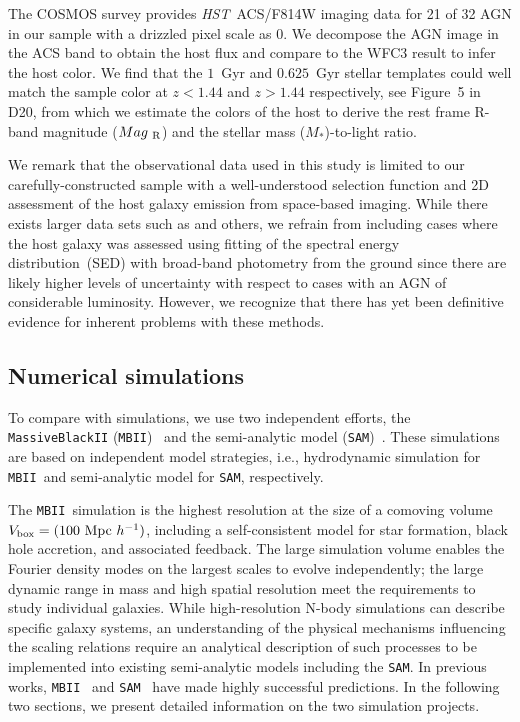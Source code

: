 \documentclass[twocolumn,trackchanges]{aastex63}
\newcommand{\hst}{{\it HST}}
\newcommand{\mr}{$Mag_{\rm ~R}$}
\newcommand{\mstar}{{$M_*$}}
\newcommand{\sam}{\texttt{SAM}}
\newcommand{\mbii}{\texttt{MBII}}
\begin{document}
The COSMOS survey provides \hst\ ACS/F814W imaging data for 21 of 32 AGN in our sample with a drizzled pixel scale as 0. We decompose the AGN image in the ACS band to obtain the host flux and compare to the WFC3 result to infer the host color. We find that the $1$~Gyr and $0.625$~Gyr stellar templates could well match the sample color at $z<1.44$ and $z>1.44$ respectively, see Figure~5 in D20, from which we estimate the colors of the host to derive the rest frame R-band magnitude (\mr) and the stellar mass (\mstar)-to-light ratio.

We remark that the observational data used in this study is limited to our carefully-constructed sample with a well-understood selection function and 2D assessment of the host galaxy emission from space-based imaging. While there exists larger data sets such as \citet{Sun2015} and others, we refrain from including cases where the host galaxy was assessed using fitting of the spectral energy distribution~(SED) with broad-band photometry from the ground since there are likely higher levels of uncertainty with respect to cases with an AGN of considerable luminosity. However, we recognize that there has yet been definitive evidence for inherent problems with these methods.

\subsection{Numerical simulations}\label{sample_sim}
To compare with simulations, we use two independent efforts, the \texttt{MassiveBlackII} (\texttt{MBII})~\citep{Khandai2015} and the semi-analytic model (\texttt{SAM})~\citep{Menci2014}. These simulations are based on independent model strategies, i.e., hydrodynamic simulation for \mbii\ and semi-analytic model for \sam, respectively.

The \mbii\ simulation is the highest resolution at the size of a comoving volume $V_{\rm box} = (100~{\rm Mpc}~h^{-1})$, including a self-consistent model for star formation, black hole accretion, and associated feedback. The large simulation volume enables the Fourier density modes on the largest scales to evolve independently; the large dynamic range in mass and high spatial resolution meet the requirements to study individual galaxies. While high-resolution N-body simulations can describe specific galaxy systems, an understanding of the physical mechanisms influencing the scaling relations require an analytical description of such processes to be implemented into existing semi-analytic models including the \sam. In previous works, \mbii~\citep{Huang2018, DeG++15, Khandai2015,Bhowmick2019} and \sam~\citep{Menci2014, Menci2016} have made highly successful predictions. In the following two sections, we present detailed information on the two simulation projects.
\end{document}
